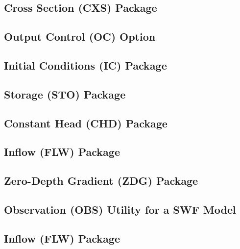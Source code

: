 \newpage
\subsection{Cross Section (CXS) Package}


\newpage
\subsection{Output Control (OC) Option}


\newpage
\subsection{Initial Conditions (IC) Package}


\newpage
\subsection{Storage (STO) Package}


\newpage
\subsection{Constant Head (CHD) Package}


\newpage
\subsection{Inflow (FLW) Package}


\newpage
\subsection{Zero-Depth Gradient (ZDG) Package}


\newpage
\subsection{Observation (OBS) Utility for a SWF Model}


\newpage
\subsection{Inflow (FLW) Package}



